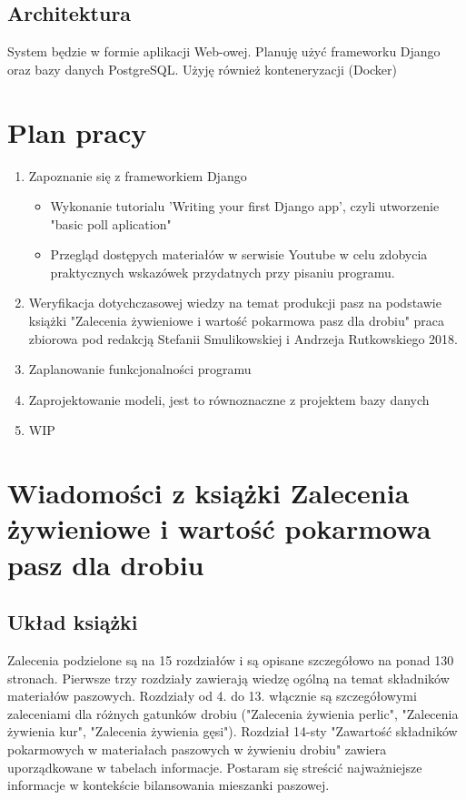 \documentclass[shortabstract]{iithesis}
\begin{document}
\section {Architektura}
	System będzie w formie aplikacji Web-owej. Planuję użyć frameworku Django oraz bazy danych PostgreSQL. Użyję również konteneryzacji (Docker)

\chapter{Plan pracy}
	\begin{enumerate}
		\item  Zapoznanie się z frameworkiem Django
			\begin{itemize}
				\item Wykonanie tutorialu 'Writing your first Django app', czyli utworzenie "basic poll aplication"
				\item Przegląd dostępych materiałów w serwisie Youtube w celu zdobycia praktycznych wskazówek przydatnych przy pisaniu programu.
			\end{itemize}
		\item Weryfikacja dotychczasowej wiedzy na temat produkcji pasz na podstawie książki "Zalecenia żywieniowe i wartość pokarmowa pasz dla drobiu" praca zbiorowa pod redakcją Stefanii Smulikowskiej i Andrzeja Rutkowskiego 2018.
		\item Zaplanowanie funkcjonalności programu
		\item Zaprojektowanie modeli, jest to równoznaczne z projektem bazy danych
		\item WIP
	\end{enumerate}
	
\chapter{Wiadomości z  książki Zalecenia żywieniowe i wartość pokarmowa pasz dla drobiu}

\section{Układ książki}
Zalecenia podzielone są na 15 rozdziałów i są opisane szczegółowo na ponad 130 stronach. 
Pierwsze trzy rozdziały zawierają wiedzę ogólną na temat składników materiałów paszowych.
Rozdziały od 4. do 13. włącznie są szczegółowymi zaleceniami dla różnych gatunków drobiu ("Zalecenia żywienia perlic", "Zalecenia żywienia kur", "Zalecenia żywienia gęsi").
Rozdział 14-sty "Zawartość składników pokarmowych w materiałach paszowych w żywieniu drobiu" zawiera uporządkowane w tabelach informacje.
Postaram się streścić najważniejsze informacje w kontekście bilansowania mieszanki paszowej.
\end{document}
